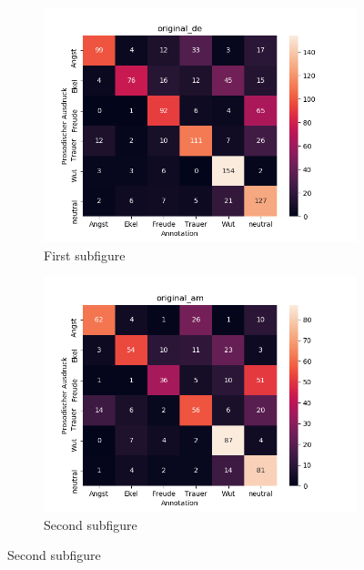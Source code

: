 \documentclass[11pt,a4paper,headsepline,twoside,toc=bibliography]{scrreprt}
\begin{document}
\begin{figure}[t!] %
	\begin{subfigure}{0.48\textwidth}
		\includegraphics[width=\linewidth]{plots/heatmap/conf_original_de.png}
		\caption{First subfigure} \label{fig:conf_original_de}
	\end{subfigure}\hspace*{\fill}
	\begin{subfigure}{0.48\textwidth}
		\includegraphics[width=\linewidth]{plots/heatmap/conf_original_am.png}
		\caption{Second subfigure} \label{fig:conf_original_de}
	\end{subfigure}
	

\end{figure}
\end{document}
